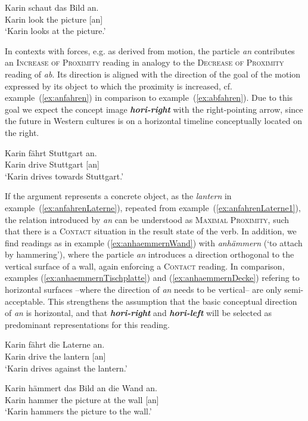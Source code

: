 \documentclass[output=paper]{langsci/langscibook}
\newcommand{\textci}[1]{\textit{\textbf{#1}}}
\begin{document}
\ea\label{ex:anschauen}
\gll Karin schaut das Bild an.\\
Karin look the picture [an]\\
\glt `Karin looks at the picture.'
\z

In contexts with forces, e.g. as derived from motion, the particle
\textit{an} contributes an \textsc{Increase of Proximity} reading in
analogy to the \textsc{Decrease of Proximity} reading of
\textit{ab}. Its direction is aligned with the direction of the goal
of the motion expressed by its object to which the proximity is
increased, cf. example~(\ref{ex:anfahren}) in comparison to
example~(\ref{ex:abfahren}). Due to this goal we expect the concept image
\textci{hori-right} with the right-pointing arrow, since the future in
Western cultures is on a horizontal timeline conceptually located on
the right.

\ea\label{ex:anfahren}
\gll Karin fährt Stuttgart an.\\
Karin drive Stuttgart [an]\\
\glt `Karin drives towards Stuttgart.'
\z

If the argument represents a concrete object, as the \textit{lantern}
in example~(\ref{ex:anfahrenLaterne}), repeated from
example~(\ref{ex:anfahrenLaterne1}), the relation introduced by
\textit{an} can be understood as \textsc{Maximal Proximity}, such that
there is a \textsc{Contact} situation in the result state of the
verb. In addition, we find readings as in example
(\ref{ex:anhaemmernWand}) with \textit{anhämmern} (`to attach by
hammering'), where the particle \textit{an} introduces a direction
orthogonal to the vertical surface of a wall, again enforcing a
\textsc{Contact} reading. In comparison, examples
(\ref{ex:anhaemmernTischplatte}) and (\ref{ex:anhaemmernDecke})
refering to horizontal surfaces --where the direction of \textit{an}
needs to be vertical-- are only semi-acceptable. This strengthens the
assumption that the basic conceptual direction of \textit{an} is
horizontal, and that \textci{hori-right} and \textci{hori-left} will
be selected as predominant representations for this reading.

\ea\label{ex:anfahrenLaterne}
\gll Karin fährt die Laterne an.\\
Karin drive the lantern [an]\\
\glt `Karin drives against the lantern.'
\z

\ea\label{ex:anhaemmernWand}
\gll Karin hämmert das Bild an die Wand an.\\
Karin hammer the picture at the wall [an]\\
\glt `Karin hammers the picture to the wall.'
\z
\end{document}
